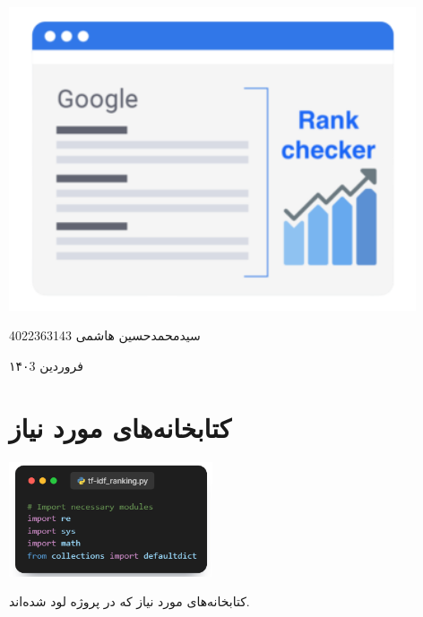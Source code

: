 \documentclass[12pt, dvipsnames, svgnames, x11names,]{article}
\begin{document}
	\begin{titlepage}
		\centering
		\vspace{1cm}
		{\Huge {\textbf{}}\par}
		\vspace{15mm}
		\vspace{16mm}
		\includegraphics[width=12cm]{images/00.png} \par
		\vfill \par	\vfill
		\vspace{16mm}
		{\normalsize	سیدمحمدحسین هاشمی  4022363143 \par}
		\vspace{1cm}
		{\large فروردین ۱۴۰3\par}
	\end{titlepage}
	\tableofcontents
	\newpage
	
	
	\section{کتابخانه‌های مورد نیاز}

		\begin{center}
			{\includegraphics[width=6cm]{images/01.png}}
		\end{center}

		{\normalsize کتابخانه‌های مورد نیاز که در پروژه لود شده‌اند.}
\end{document}
